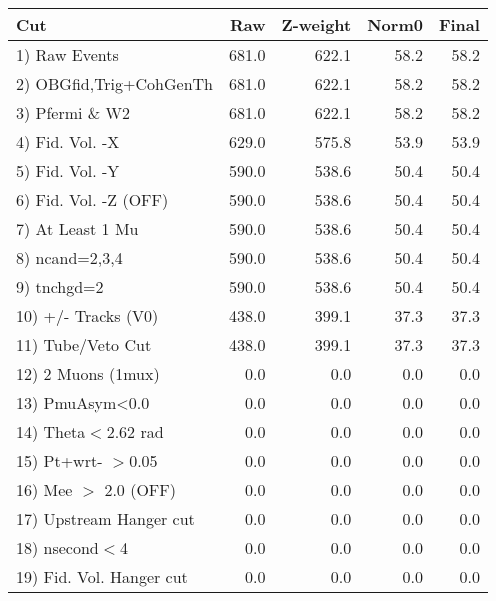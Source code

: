  \begin{table}[h!]\centering
 \begin{tabular}{||l||r|r|r|r||}
 \hline
 \hline
 Cut & Raw & Z-weight & Norm0 & Final \\
 \hline
  1) Raw Events           &       681.0 &       622.1 &        58.2 &        58.2 \\
  2) OBGfid,Trig+CohGenTh &       681.0 &       622.1 &        58.2 &        58.2 \\
  3) Pfermi \& W2         &       681.0 &       622.1 &        58.2 &        58.2 \\
  4) Fid. Vol. -X         &       629.0 &       575.8 &        53.9 &        53.9 \\
  5) Fid. Vol. -Y         &       590.0 &       538.6 &        50.4 &        50.4 \\
  6) Fid. Vol. -Z (OFF)   &       590.0 &       538.6 &        50.4 &        50.4 \\
  7) At Least 1 Mu        &       590.0 &       538.6 &        50.4 &        50.4 \\
  8) ncand=2,3,4          &       590.0 &       538.6 &        50.4 &        50.4 \\
  9) tnchgd=2             &       590.0 &       538.6 &        50.4 &        50.4 \\
 10) +/- Tracks (V0)      &       438.0 &       399.1 &        37.3 &        37.3 \\
 11) Tube/Veto Cut        &       438.0 &       399.1 &        37.3 &        37.3 \\
 12) 2 Muons (1mux)       &         0.0 &         0.0 &         0.0 &         0.0 \\
 13) PmuAsym<0.0          &         0.0 &         0.0 &         0.0 &         0.0 \\
 14) Theta$<$2.62 rad     &         0.0 &         0.0 &         0.0 &         0.0 \\
 15) Pt+wrt- $>$0.05      &         0.0 &         0.0 &         0.0 &         0.0 \\
 16) Mee $>$ 2.0  (OFF)   &         0.0 &         0.0 &         0.0 &         0.0 \\
 17) Upstream Hanger cut  &         0.0 &         0.0 &         0.0 &         0.0 \\
 18) nsecond$<$4          &         0.0 &         0.0 &         0.0 &         0.0 \\
 19) Fid. Vol. Hanger cut &         0.0 &         0.0 &         0.0 &         0.0 \\

\end{tabular}
\end{table}
